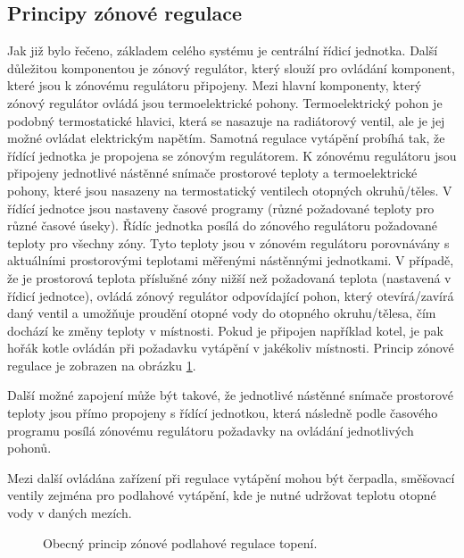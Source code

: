 \subsection{Principy zónové regulace}
Jak již bylo řečeno, základem celého systému je centrální řídicí jednotka. Další důležitou komponentou je zónový regulátor, který slouží pro ovládání komponent, které jsou k zónovému regulátoru připojeny. Mezi hlavní komponenty, který zónový regulátor ovládá jsou termoelektrické pohony. Termoelektrický pohon je podobný termostatické hlavici, která se nasazuje na radiátorový ventil, ale je jej možné ovládat elektrickým napětím. Samotná regulace vytápění probíhá tak, že řídící jednotka je propojena se zónovým regulátorem. K zónovému regulátoru jsou připojeny jednotlivé nástěnné snímače  prostorové teploty a termoelektrické pohony, které jsou nasazeny na termostatický ventilech otopných okruhů/těles. V řídící jednotce jsou nastaveny časové programy (různé požadované teploty pro různé časové úseky). Řídíc jednotka posílá do zónového regulátoru požadované teploty pro všechny zóny. Tyto  teploty jsou v zónovém regulátoru porovnávány s aktuálními prostorovými teplotami měřenými nástěnnými jednotkami. V případě, že je prostorová teplota příslušné zóny nižší než požadovaná teplota (nastavená v řídicí jednotce), ovládá zónový regulátor odpovídající pohon, který otevírá/zavírá daný ventil a umožňuje proudění otopné vody do otopného okruhu/tělesa, čím dochází ke změny teploty v místnosti. Pokud je připojen například kotel, je pak hořák kotle ovládán při požadavku vytápění v jakékoliv místnosti. Princip zónové regulace je zobrazen na obrázku \ref{fig:obecny-princip-zonove-regulace}.

Další možné zapojení může být takové, že jednotlivé nástěnné snímače prostorové teploty jsou přímo propojeny s řídící jednotkou, která následně podle časového programu posílá zónovému regulátoru požadavky na ovládání jednotlivých pohonů. 

Mezi další ovládána zařízení při regulace vytápění mohou být čerpadla, směšovací ventily zejména pro podlahové vytápění, kde je nutné udržovat teplotu otopné vody v daných mezích.

\begin{figure}[H]
    \centering
    \def\svgwidth{\columnwidth}
    
    \caption{ Obecný princip zónové podlahové regulace topení.}
    \label{fig:obecny-princip-zonove-regulace}
\end{figure}




